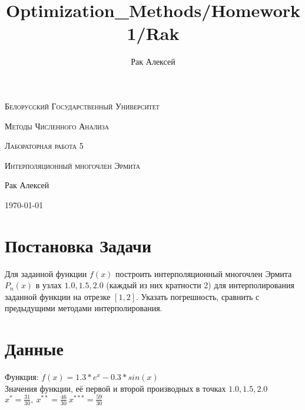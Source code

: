 \documentclass[10pt]{scrartcl}
\begin{document}
\author{Рак Алексей}
\title{Optimization_Methods/Homework1/Rak}
\begin{titlepage}
		\centering
		{\scshape\LARGE Белорусский Государственный Университет \par}
        \vfill
        {\scshape\LARGE Методы Численного Анализа\par}
        \vspace{1cm}
        {\scshape\LARGE Лабораторная работа 5\par}
        \vspace{1cm}
        {\scshape\LARGE Интерполяционный многочлен Эрмита\par}
        \vspace{2cm}
        {\LARGE Рак Алексей\par}
        \vfill
        {\large \today}
\end{titlepage}
\section*{Постановка Задачи}\noindent
Для заданной функции $f(x)$ построить интерполяционный многочлен Эрмита $P_n(x)$ в узлах $1.0, 1.5, 2.0$ (каждый из них кратности 2) для интерполирования заданной функции на отрезке $[1, 2]$. Указать
погрешность, сравнить с предыдущими методами интерполирования.
\section*{Данные}\noindent
Функция: $f(x) = 1.3 * e^x - 0.3 * sin(x)$\\
Значения функции, её первой и второй производных в точках $1.0, 1.5, 2.0$\\
$x^{*} = \frac{31}{30}, \ x^{**} = \frac{46}{30} \ x^{***} = \frac{59}{30}$
\end{document}
